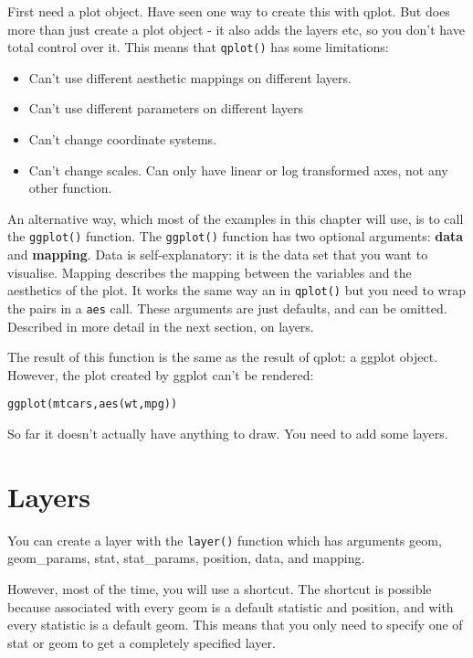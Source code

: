First need a plot object.  Have seen one way to create this with qplot.  But does more than just create a plot object - it also adds the layers etc, so you don't have total control over it. This means that {\tt qplot()} has some limitations:

\begin{itemize}
  \item Can't use different aesthetic mappings on different layers.  
  \item Can't use different parameters on different layers
  \item Can't change coordinate systems.  
  \item Can't change scales.  Can only have linear or log transformed axes, not any other function.
\end{itemize}

An alternative way, which most of the examples in this chapter will use, is to call the {\tt ggplot()} function.  The {\tt ggplot()} function has two optional arguments: {\bf data} and {\bf mapping}.  Data is self-explanatory: it is the data set that you want to visualise.  Mapping describes the mapping between the variables and the aesthetics of the plot.  It works the same way an in {\tt qplot()} but you need to wrap the pairs in a {\tt aes} call.  These arguments are just defaults, and can be omitted.  Described in more detail in the next section, on layers.

The result of this function is the same as the result of qplot: a ggplot object.  However, the plot created by ggplot can't be rendered:

\begin{alltt}
  ggplot(mtcars, aes(wt, mpg))
\end{alltt}

So far it doesn't actually have anything to draw.  You need to add some layers.

\section{Layers}\label{sec:layers}


You can create a layer with the {\tt layer()} function which has arguments geom, geom_params, stat, stat_params, position, data, and mapping.

However, most of the time, you will use a shortcut.  The shortcut is possible because associated with every geom is a default statistic and position, and with every statistic is a default geom.  This means that you only need to specify one of stat or geom to get a completely specified layer.

